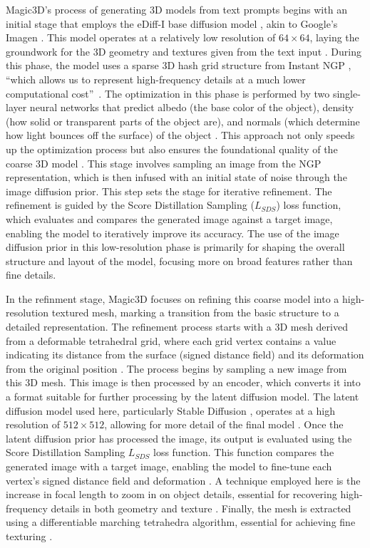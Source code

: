 Magic3D's process of generating 3D models from text prompts begins with an initial stage that employs the eDiff-I base diffusion model \citep{balaji2022eDiff-I}, akin to Google's Imagen \citep{saharia2022imagen}. This model operates at a relatively low resolution of \(64 \times 64\), laying the groundwork for the 3D geometry and textures given from the text input \citep{lin2022magic3d}. During this phase, the model uses a sparse 3D hash grid structure from Instant NGP \citep{mueller2022instant}, ``which allows us to represent high-frequency details at a much lower computational cost''~\citep{lin2022magic3d}. The optimization in this phase is performed by two single-layer neural networks that predict albedo (the base color of the object), density (how solid or transparent parts of the object are), and normals (which determine how light bounces off the surface) of the object \citep{lin2022magic3d}. This approach not only speeds up the optimization process but also ensures the foundational quality of the coarse 3D model \citep{lin2022magic3d}. 
This stage involves sampling an image from the NGP representation, which is then infused with an initial state of noise through the image diffusion prior. This step sets the stage for iterative refinement. The refinement is guided by the Score Distillation Sampling (\(L_{SDS}\)) loss function, which evaluates and compares the generated image against a target image, enabling the model to iteratively improve its accuracy. The use of the image diffusion prior in this low-resolution phase is primarily for shaping the overall structure and layout of the model, focusing more on broad features rather than fine details.

In the refinment stage, Magic3D focuses on refining this coarse model into a high-resolution textured mesh, marking a transition from the basic structure to a detailed representation. The refinement process starts with a 3D mesh derived from a deformable tetrahedral grid, where each grid vertex contains a value indicating its distance from the surface (signed distance field) and its deformation from the original position \citep{shen2021DMTet, lin2022magic3d}. The process begins by sampling a new image from this 3D mesh. This image is then processed by an encoder, which converts it into a format suitable for further processing by the latent diffusion model. The latent diffusion model used here, particularly Stable Diffusion \citep{rombachStableDiffusion}, operates at a high resolution of \(512 \times 512\), allowing for more detail of the final model \citep{lin2022magic3d}. Once the latent diffusion prior has processed the image, its output is evaluated using the Score Distillation Sampling \(L_{SDS}\) loss function. This function compares the generated image with a target image, enabling the model to fine-tune each vertex's signed distance field and deformation \citep{lin2022magic3d}. A technique employed here is the increase in focal length to zoom in on object details, essential for recovering high-frequency details in both geometry and texture \citep{lin2022magic3d}. Finally, the mesh is extracted using a differentiable marching tetrahedra algorithm, essential for achieving fine texturing \citep{lin2022magic3d}.

